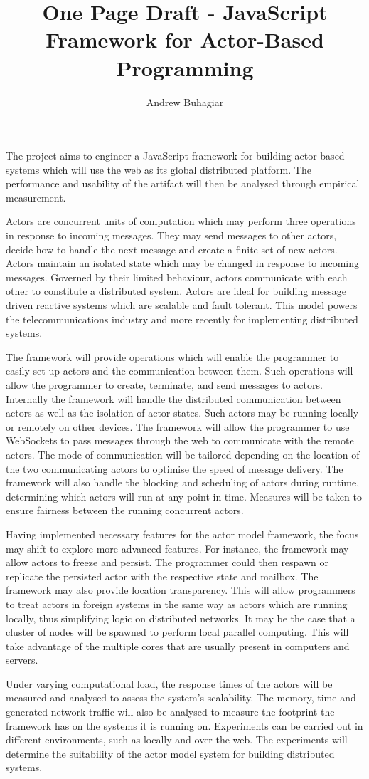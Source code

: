\documentclass[12pt]{report}
\author{Andrew Buhagiar}
\title{One Page Draft - JavaScript Framework for Actor-Based Programming}
\begin{document}
\maketitle
The project aims to engineer a JavaScript framework for building actor-based systems which will use the web as its global distributed platform. The performance and usability of the artifact will then be analysed through empirical measurement.

Actors are concurrent units of computation which may perform three operations in response to incoming messages. They may send messages to other actors, decide how to handle the next message and create a finite set of new actors. Actors maintain an isolated state which may be changed in response to incoming messages\cite{agha_1985}. Governed by their limited behaviour, actors communicate with each other to constitute a distributed system. Actors are ideal for building message driven reactive systems\cite{reactivemanifesto} which are scalable and fault tolerant. This model powers the telecommunications industry and more recently for implementing distributed systems.

The framework will provide operations which will enable the programmer to easily set up actors and the communication between them. Such operations will allow the programmer to create, terminate, and send messages to actors. Internally the framework will handle the distributed communication between actors as well as the isolation of actor states. Such actors may be running locally or remotely on other devices. The framework will allow the programmer to use WebSockets to pass messages through the web to communicate with the remote actors. The mode of communication will be tailored depending on the location of the two communicating actors to optimise the speed of message delivery. The framework will also handle the blocking and scheduling of actors during runtime, determining which actors will run at any point in time. Measures will be taken to ensure fairness between the running concurrent actors.

Having implemented necessary features for the actor model framework, the focus may shift to explore more advanced features. For instance, the framework may allow actors to freeze and persist. The programmer could then respawn or replicate the persisted actor with the respective state and mailbox. The framework may also provide location transparency. This will allow programmers to treat actors in foreign systems in the same way as actors which are running locally, thus simplifying logic on distributed networks. It may be the case that a cluster of nodes will be spawned to perform local parallel computing. This will take advantage of the multiple cores that are usually present in computers and servers.

Under varying computational load, the response times of the actors will be measured and analysed to assess the system’s scalability. The memory, time and generated network traffic will also be analysed to measure the footprint the framework has on the systems it is running on. Experiments can be carried out in different environments, such as locally and over the web. The experiments will determine the suitability of the actor model system for building distributed systems.


\end{document}
